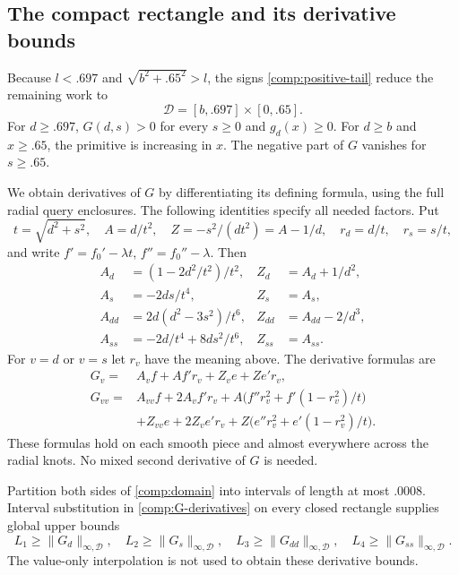 \subsection{The compact rectangle and its derivative bounds}
\label{comp:rectangle}

Because $l<.697$ and $\sqrt{b^2+.65^2}>l$, the signs
\eqref{comp:positive-tail} reduce the remaining work to
\begin{equation}\label{comp:domain}
 \mathcal D=[b,.697]\times[0,.65].
\end{equation}
For $d\ge.697$, $G(d,s)>0$ for every $s\ge0$ and $g_d(x)\ge0$.
For $d\ge b$ and $x\ge.65$, the primitive is increasing in $x$.
The negative part of $G$ vanishes for $s\ge.65$.

We obtain derivatives of $G$ by differentiating its defining
formula, using the full radial query enclosures.  The following
identities specify all needed factors.  Put
\[
 t=\sqrt{d^2+s^2},\quad A=d/t^2,\quad
 Z=-s^2/(dt^2)=A-1/d,\quad r_d=d/t,\quad r_s=s/t,
\]
and write $f'=f_0'-\lambda t$, $f''=f_0''-\lambda$.
Then
\begin{equation}\label{comp:rational-derivatives}
 \begin{aligned}
 A_d&=(1-2d^2/t^2)/t^2,&Z_d&=A_d+1/d^2,\\
 A_s&=-2ds/t^4,&Z_s&=A_s,\\
 A_{dd}&=2d(d^2-3s^2)/t^6,&Z_{dd}&=A_{dd}-2/d^3,\\
 A_{ss}&=-2d/t^4+8ds^2/t^6,&Z_{ss}&=A_{ss}.
 \end{aligned}
\end{equation}
For $v=d$ or $v=s$ let $r_v$ have the meaning above.  The derivative
formulas are
\begin{equation}\label{comp:G-derivatives}
 \begin{split}
 G_v={}&A_vf+Af'r_v+Z_ve+Ze'r_v,\\
 G_{vv}={}&A_{vv}f+2A_vf'r_v
       +A\bigl(f''r_v^2+f'(1-r_v^2)/t\bigr)\\
 &+Z_{vv}e+2Z_ve'r_v
       +Z\bigl(e''r_v^2+e'(1-r_v^2)/t\bigr).
 \end{split}
\end{equation}
These formulas hold on each smooth piece and almost everywhere
across the radial knots.  No mixed second derivative of $G$ is
needed.

Partition both sides of \eqref{comp:domain} into intervals of
length at most $.0008$.  Interval substitution in
\eqref{comp:G-derivatives} on every closed rectangle supplies
global upper bounds
\begin{equation}\label{comp:global-derivative-bounds}
 L_1\ge\|G_d\|_{\infty,\mathcal D},\quad
 L_2\ge\|G_s\|_{\infty,\mathcal D},\quad
 L_3\ge\|G_{dd}\|_{\infty,\mathcal D},\quad
 L_4\ge\|G_{ss}\|_{\infty,\mathcal D}.
\end{equation}
The value-only interpolation is not used to obtain these derivative
bounds.

